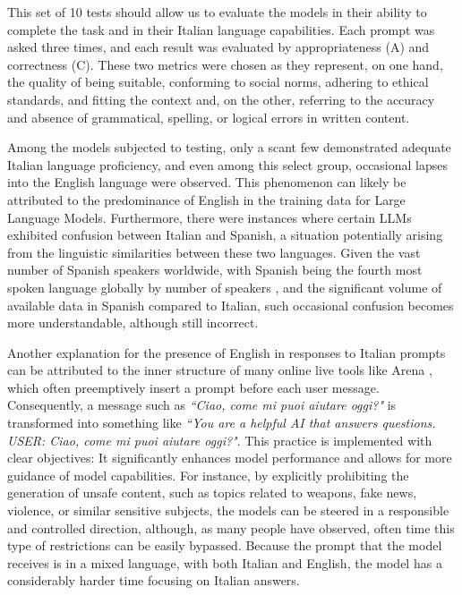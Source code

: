 This set of 10 tests should allow us to evaluate the models in their ability to complete the task and in their Italian language capabilities. Each prompt was asked three times, and each result was evaluated by appropriateness (A) and correctness (C). These two metrics were chosen as they represent, on one hand, the quality of being suitable, conforming to social norms, adhering to ethical standards, and fitting the context and, on the other, referring to the accuracy and absence of grammatical, spelling, or logical errors in written content. 

% 
% 
Among the models subjected to testing, only a scant few demonstrated adequate Italian language proficiency, and even among this select group, occasional lapses into the English language were observed. This phenomenon can likely be attributed to the predominance of English in the training data for Large Language Models. Furthermore, there were instances where certain LLMs exhibited confusion between Italian and Spanish, a situation potentially arising from the linguistic similarities between these two languages. Given the vast number of Spanish speakers worldwide, with Spanish being the fourth most spoken language globally by number of speakers \cite{spanish-speakers}, and the significant volume of available data in Spanish compared to Italian, such occasional confusion becomes more understandable, although still incorrect.

Another explanation for the presence of English in responses to Italian prompts can be attributed to the inner structure of many online live tools like Arena \cite{arena}, which often preemptively insert a prompt before each user message. Consequently, a message such as \emph{``Ciao, come mi puoi aiutare oggi?"} is transformed into something like \emph{``You are a helpful AI that answers questions. USER: Ciao, come mi puoi aiutare oggi?"}. This practice is implemented with clear objectives: It significantly enhances model performance and allows for more guidance of model capabilities. For instance, by explicitly prohibiting the generation of unsafe content, such as topics related to weapons, fake news, violence, or similar sensitive subjects, the models can be steered in a responsible and controlled direction, although, as many people have observed, often time this type of restrictions can be easily bypassed. Because the prompt that the model receives is in a mixed language, with both Italian and English, the model has a considerably harder time focusing on Italian answers.

